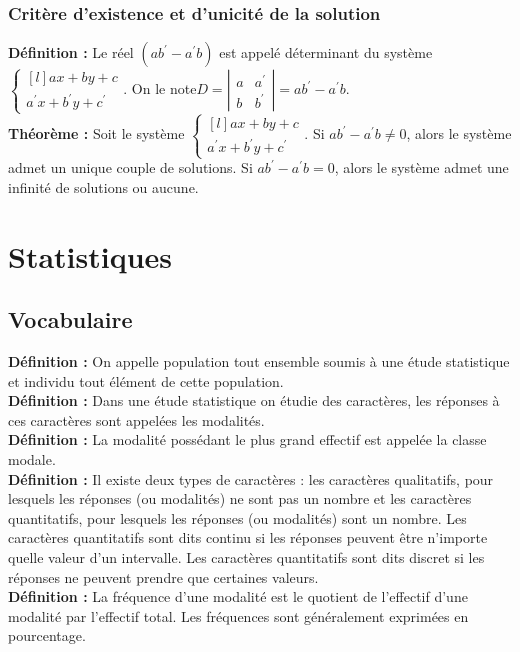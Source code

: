 \documentclass[a4paper,titlepage]{article}
\let\oldsection\section
\renewcommand\section{\clearpage\oldsection}
\begin{document}
        \subsubsection{Critère d’existence et d’unicité de la solution}
            \textbf{Définition :} Le réel $\left(ab^{\prime}-a^{\prime}b\right)$ est appelé déterminant du système $\left\{\begin{smallmatrix*}[l]ax+by+c\\a^{\prime}x+b^{\prime}y+c^{\prime}\end{smallmatrix*}\!\right.$. On le note\linebreak$D=\left|\begin{smallmatrix}a&a^{\prime}\\b&b^{\prime}\end{smallmatrix}\right|=ab^{\prime}-a^{\prime}b$.
            \\
            \textbf{Théorème :} Soit le système $\left\{\begin{smallmatrix*}[l]ax+by+c\\a^{\prime}x+b^{\prime}y+c^{\prime}\end{smallmatrix*}\!\right.$. Si $ab^{\prime}-a^{\prime}b\neq0$, alors le système admet un unique couple de solutions. Si $ab^{\prime}-a^{\prime}b=0$, alors le système admet une infinité de solutions ou aucune.
\section{Statistiques}
    \subsection{Vocabulaire}
        \textbf{Définition :} On appelle population tout ensemble soumis à une étude statistique et individu tout élément de cette population.
        \\
        \textbf{Définition :} Dans une étude statistique on étudie des caractères, les réponses à ces caractères sont appelées les modalités.
        \\
        \textbf{Définition :} La modalité possédant le plus grand effectif est appelée la classe modale.
        \\
        \textbf{Définition :}  Il existe deux types de caractères : les caractères qualitatifs, pour lesquels les réponses (ou modalités) ne sont pas un nombre et les caractères quantitatifs, pour lesquels les réponses (ou modalités) sont un nombre. Les caractères quantitatifs sont dits continu si les réponses peuvent être n’importe quelle valeur d’un intervalle. Les caractères quantitatifs sont dits discret si les réponses ne peuvent prendre que certaines valeurs.
        \\
        \textbf{Définition :} La fréquence d’une modalité est le quotient de l’effectif d’une modalité par l’effectif total. Les fréquences sont généralement exprimées en pourcentage.
\end{document}

